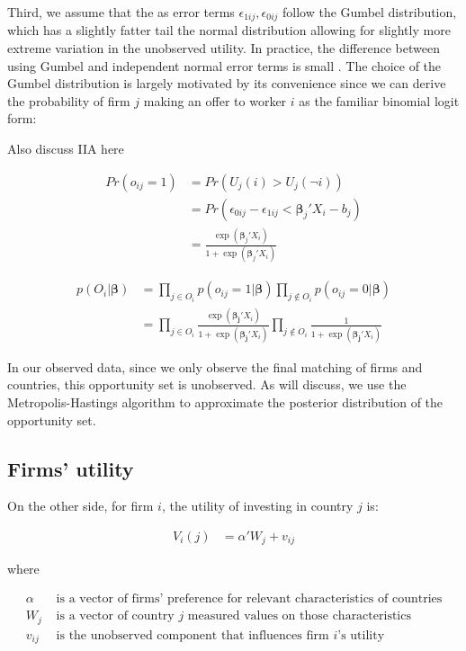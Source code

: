 Third, we assume that the as error terms $\epsilon_{1ij}, \epsilon_{0ij}$ follow
the Gumbel distribution, which has a slightly fatter tail the normal
distribution allowing for slightly more extreme variation in the unobserved
utility. In practice, the difference between using Gumbel and independent normal
error terms is small \citep{Train2009}. The choice of the Gumbel distribution is largely motivated by its
convenience since we can derive the probability of firm $j$ making an offer to worker $i$ as the familiar binomial logit form:

Also discuss IIA here

\begin{align}
Pr(o_{ij} = 1) &= Pr(U_j(i) > U_j(\neg i)) \\
&= Pr(\epsilon_{0ij} - \epsilon_{1ij} <  \bm{\beta}_j ' X_i - b_j) \\
&= \frac{\exp({\bm{\beta}_j'X_i})}{1 + \exp({\bm{\beta}_j'X_i})} \label{eq:prob_offer_ij}
\end{align}

\begin{align}
p(O_i | \bm{\beta}) &= \prod_{j \in O_i} p(o_{ij} = 1 | \bm{\beta}) \prod_{j \notin O_i} p(o_{ij} = 0 | \bm{\beta}) \\
&= \prod_{j \in O_i} \frac{\exp(\bm{\beta_j} ' X_i)}{1 + \exp(\bm{\beta_j}' X_i)}
 \prod_{j \notin O_i} \frac{1}{1 + \exp(\bm{\beta_j}' X_i)} \label{eq:conditional_probability_of_offer}
\end{align}

In our observed data, since we only observe the final matching of firms and countries, this opportunity set is unobserved. As will discuss, we use the Metropolis-Hastings algorithm to approximate the posterior distribution of the opportunity set.

\subsection{Firms' utility}

On the other side, for firm $i$, the utility of investing in country $j$ is:

\begin{align}
V_i(j) &= \alpha' W_{j} + v_{ij}
\end{align}

where

\begin{align*}
\alpha &\text{ is a vector of firms' preference for relevant characteristics of countries} \\
W_j &\text{ is a vector of country $j$ measured values on those characteristics} \\
v_{ij} &\text{ is the unobserved component that influences firm $i$'s utility}
\end{align*}

